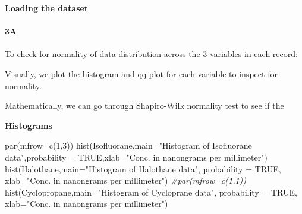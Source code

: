 \documentclass[
]{article}
\newenvironment{Shaded}{\begin{snugshade}}{\end{snugshade}}
\newcommand{\AttributeTok}[1]{\textcolor[rgb]{0.77,0.63,0.00}{#1}}
\newcommand{\CommentTok}[1]{\textcolor[rgb]{0.56,0.35,0.01}{\textit{#1}}}
\newcommand{\ConstantTok}[1]{\textcolor[rgb]{0.00,0.00,0.00}{#1}}
\newcommand{\DecValTok}[1]{\textcolor[rgb]{0.00,0.00,0.81}{#1}}
\newcommand{\FunctionTok}[1]{\textcolor[rgb]{0.00,0.00,0.00}{#1}}
\newcommand{\NormalTok}[1]{#1}
\newcommand{\OtherTok}[1]{\textcolor[rgb]{0.56,0.35,0.01}{#1}}
\newcommand{\SpecialCharTok}[1]{\textcolor[rgb]{0.00,0.00,0.00}{#1}}
\newcommand{\StringTok}[1]{\textcolor[rgb]{0.31,0.60,0.02}{#1}}
\begin{document}
\textbf{Loading the dataset}

\begin{Shaded}
\end{Shaded}

\hypertarget{a-2}{%
\paragraph{\texorpdfstring{\textbf{3A}}{3A}}\label{a-2}}

To check for normality of data distribution across the 3 variables in
each record:

Visually, we plot the histogram and qq-plot for each variable to inspect
for normality.

Mathematically, we can go through Shapiro-Wilk normality test to see if
the

\textbf{Histograms}

\begin{Shaded}
\begin{Highlighting}[]
\FunctionTok{par}\NormalTok{(}\AttributeTok{mfrow=}\FunctionTok{c}\NormalTok{(}\DecValTok{1}\NormalTok{,}\DecValTok{3}\NormalTok{))}
\FunctionTok{hist}\NormalTok{(Isofluorane,}\AttributeTok{main=}\StringTok{"Histogram of Isofluorane data"}\NormalTok{,}\AttributeTok{probability =} \ConstantTok{TRUE}\NormalTok{,}\AttributeTok{xlab=}\StringTok{"Conc. in nanongrams per millimeter"}\NormalTok{)}
\FunctionTok{hist}\NormalTok{(Halothane,}\AttributeTok{main=}\StringTok{"Histogram of Halothane data"}\NormalTok{, }\AttributeTok{probability =} \ConstantTok{TRUE}\NormalTok{, }\AttributeTok{xlab=}\StringTok{"Conc. in nanongrams per millimeter"}\NormalTok{)}
\CommentTok{\#par(mfrow=c(1,1))}
\FunctionTok{hist}\NormalTok{(Cyclopropane,}\AttributeTok{main=}\StringTok{"Histogram of Cycloprane data"}\NormalTok{, }\AttributeTok{probability =} \ConstantTok{TRUE}\NormalTok{, }\AttributeTok{xlab=}\StringTok{"Conc. in nanongrams per millimeter"}\NormalTok{)}
\end{Highlighting}
\end{Shaded}
\end{document}
